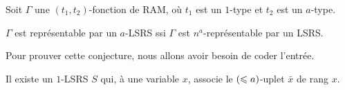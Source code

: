 	\begin{conj}
		\label{conj:rep_a_LSRS_rep_na_LSRS}
		Soit $\Gamma$ une $(t_1,t_2)$-fonction de RAM, où $t_1$ est un $1$-type et $t_2$ est un $a$-type.
		
		$\Gamma$ est représentable par un $a$-LSRS ssi $\Gamma$ est $n^a$-représentable par un LSRS.
	\end{conj}
		
	Pour prouver cette conjecture, nous allons avoir besoin de coder l'entrée.
	
	\begin{lemma}
		\label{lem:decomp_rang_par_LSRS}
		
		Il existe un $1$-LSRS $S$ qui, à une variable $x$, associe le $\left( \leqslant a \right)$-uplet $\bar{x}$ de rang $x$. 
	\end{lemma}
		
